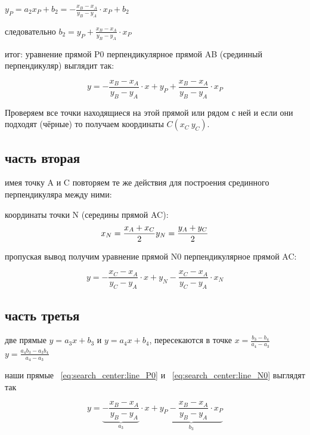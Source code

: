 \documentclass[unicode, 12pt, a4paper,oneside,fleqn]{article}
\begin{document}
$y_P = a_2x_P + b_2 = -\frac{x_B - x_A}{y_B - y_A} \cdot x_P + b_2$

следовательно $b_2 = y_P + \frac{x_B - x_A}{y_B - y_A} \cdot x_P$

итог:
уравнение прямой P0 перпендикулярное прямой AB (срединный перпендикуляр) выглядит так:

\begin{equation}
\label{eq:search_center:line_P0}
y = -\frac{x_B - x_A}{y_B - y_A} \cdot x + y_P + \frac{x_B - x_A}{y_B - y_A} \cdot x_P
\end{equation}

Проверяем все точки находящиеся на этой прямой или рядом с ней и если они подходят (чёрные) то получаем координаты $C(x_C \  y_C)$.


\subsection{часть вторая}
имея точку A и C повторяем те же действия для построения срединного перпендикуляра между ними:

координаты точки N (середины прямой AC):
\begin{equation}
\label{eq:search_center:center_AC}
  x_N = \frac{x_A + x_C}{2} \\
  y_N = \frac{y_A + y_C}{2}
\end{equation}

пропуская вывод получим уравнение прямой N0 перпендикулярное прямой AC:

\begin{equation}
\label{eq:search_center:line_N0}
y = -\frac{x_C - x_A}{y_C - y_A} \cdot x + y_N - \frac{x_C - x_A}{y_C - y_A} \cdot x_N
\end{equation}

\subsection{часть третья}

две прямые  $y = a_3x+b_3$ и $y = a_4x+b_4$, пересекаются в точке
$x=\frac{b_3-b_4}{a_4-a_3}$
$y=\frac{a_4b_3-a_3b_4}{a_4-a_3}$

наши прямые ~\ref{eq:search_center:line_P0} и ~\ref{eq:search_center:line_N0} выглядят так

\begin{equation}
\label{eq:search_center:line_Y3}
y = \underbrace{-\frac{x_B - x_A}{y_B - y_A}}_{a_3} \cdot x + \underbrace{y_P - \frac{x_B - x_A}{y_B - y_A} \cdot x_P}_{b_3}
\end{equation}
\end{document}
